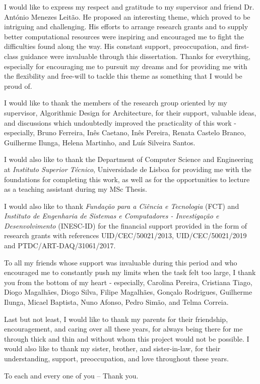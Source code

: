 
I would like to express my respect and gratitude to my supervisor and friend Dr. António Menezes Leitão. He proposed an interesting theme, which proved to be intriguing and challenging. His efforts to arrange research grants and to supply better computational resources were inspiring and encouraged me to fight the difficulties found along the way. His constant support, preoccupation, and first-class guidance were invaluable through this dissertation. Thanks for everything, especially for encouraging me to pursuit my dreams and for providing me with the flexibility and free-will to tackle this theme as something that I would be proud of.  

I would like to thank the members of the research group oriented by my supervisor, Algorithmic Design for Architecture, for their support, valuable ideas, and discussions which undoubtedly improved the practicality of this work - especially, Bruno Ferreira, Inês Caetano, Inês Pereira, Renata Castelo Branco, Guilherme Ilunga, Helena Martinho, and Luís Silveira Santos. 

I would also like to thank the Department of Computer Science and Engineering at \textit{Instituto Superior Técnico}, Universidade de Lisboa for providing me with the foundations for completing this work, as well as for the opportunities to lecture as a teaching assistant during my MSc Thesis. 

I would also like to thank \textit{Fundação para a Ciência e Tecnologia} (FCT) and \textit{Instituto de Engenharia de Sistemas e Computadores - Investigação e Desenvolvimento} (INESC-ID) for the financial support provided in the form of research grants with references UID/CEC/50021/2013, UID/CEC/50021/2019 and PTDC/ART-DAQ/31061/2017.


To all my friends whose support was invaluable during this period and who encouraged me to constantly push my limits when the task felt too large, I thank you from the bottom of my heart - especially, Carolina Pereira, Cristiana Tiago, Diogo Magalhães, Diogo Silva, Filipe Magalhães, Gonçalo Rodrigues, Guilherme Ilunga, Micael Baptista, Nuno Afonso, Pedro Simão, and Telma Correia.

Last but not least, I would like to thank my parents for their friendship, encouragement, and caring over all these years, for always being there for me through thick and thin and without whom this project would not be possible. I would also like to thank my sister, brother, and sister-in-law, for their understanding, support, preoccupation, and love throughout these years.

To each and every one of you -- Thank you.